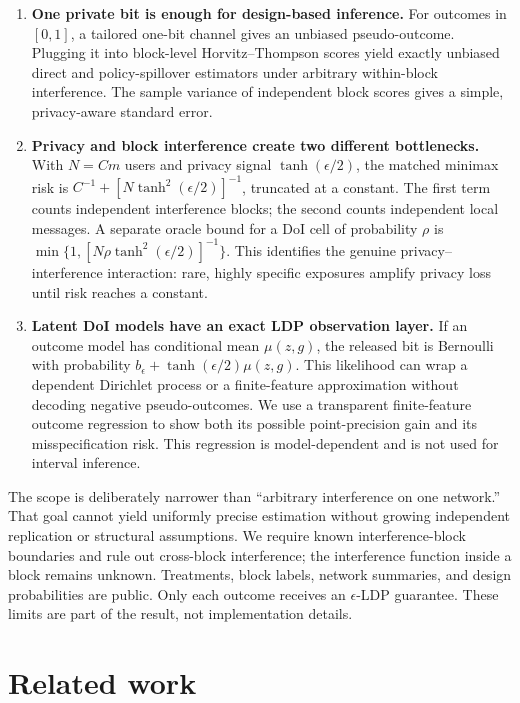 \documentclass[11pt]{article}
\theoremstyle{definition}
\theoremstyle{remark}
\begin{document}
\begin{enumerate}
  \item \textbf{One private bit is enough for design-based inference.} For outcomes in $[0,1]$,
  a tailored one-bit channel gives an unbiased pseudo-outcome. Plugging it into block-level
  Horvitz--Thompson scores \citep{HorvitzThompson1952} yield exactly unbiased direct and
  policy-spillover estimators under
  arbitrary within-block interference. The sample variance of independent block scores gives
  a simple, privacy-aware standard error.

  \item \textbf{Privacy and block interference create two different bottlenecks.} With
  $N=Cm$ users and privacy signal $\tanh(\epsilon/2)$, the matched minimax risk is
  $C^{-1}+[N\tanh^2(\epsilon/2)]^{-1}$, truncated at a constant. The first term counts
  independent interference blocks; the second counts independent local messages. A separate
  oracle bound for a DoI cell of probability $\rho$ is
  $\min\{1,[N\rho\tanh^2(\epsilon/2)]^{-1}\}$. This identifies the genuine
  privacy--interference interaction: rare, highly specific exposures amplify privacy loss
  until risk reaches a constant.

  \item \textbf{Latent DoI models have an exact LDP observation layer.} If an outcome model has
  conditional mean $\mu(z,g)$, the released bit is Bernoulli with probability
  $b_{\epsilon}+\tanh(\epsilon/2)\mu(z,g)$. This likelihood can wrap a dependent Dirichlet
  process or a finite-feature approximation without decoding negative pseudo-outcomes. We use
  a transparent finite-feature outcome regression to show both its possible point-precision
  gain and its
  misspecification risk. This regression is model-dependent and is not used for interval
  inference.
\end{enumerate}

The scope is deliberately narrower than ``arbitrary interference on one network.'' That goal
cannot yield uniformly precise estimation without growing independent replication or
structural assumptions. We require known interference-block boundaries and rule out cross-block
interference; the interference function
inside a block remains unknown. Treatments, block labels, network summaries, and design
probabilities are public. Only each outcome receives an $\epsilon$-LDP guarantee. These limits
are part of the result, not implementation details.

\section{Related work}
\end{document}
